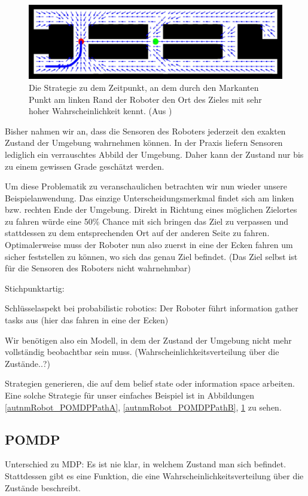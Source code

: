 \documentclass[a4paper]{IEEEtran}
\begin{document}
\begin{figure}[ht]
	\centering
	\includegraphics[scale=0.72]{images/autnmRobot_POMDPPathC.png}
	\caption{Die Strategie zu dem Zeitpunkt, an dem durch den Markanten Punkt am linken Rand der Roboter den Ort des Zieles mit sehr hoher Wahrscheinlichkeit kennt. (Aus \cite{thrun2005probabilistic})}
	\label{autnmRobot_POMDPPathC}
\end{figure}

Bisher nahmen wir an, dass die Sensoren des Roboters jederzeit den exakten Zustand der Umgebung wahrnehmen können. In der Praxis liefern Sensoren lediglich ein verrauschtes Abbild der Umgebung. Daher kann der Zustand nur bis zu einem gewissen Grade geschätzt werden.

Um diese Problematik zu veranschaulichen betrachten wir nun wieder unsere Beispielanwendung. Das einzige Unterscheidungsmerkmal findet sich am linken bzw. rechten Ende der Umgebung. Direkt in Richtung eines möglichen Zielortes zu fahren würde eine 50\% Chance mit sich bringen das Ziel zu verpassen und stattdessen zu dem entsprechenden Ort auf der anderen Seite zu fahren. Optimalerweise muss der Roboter nun also zuerst in eine der Ecken fahren um sicher feststellen zu können, wo sich das genau Ziel befindet. (Das Ziel selbst ist für die Sensoren des Roboters nicht wahrnehmbar)

Stichpunktartig: %

Schlüsselaspekt bei probabilistic robotics: Der Roboter führt information gather tasks aus (hier das fahren in eine der Ecken)

Wir benötigen also ein Modell, in dem der Zustand der Umgebung nicht mehr vollständig beobachtbar sein muss. (Wahrscheinlichkeitsverteilung über die Zustände..?)

Strategien generieren, die auf dem belief state oder information space arbeiten. Eine solche Strategie für unser einfaches Beispiel ist in Abbildungen \ref{autnmRobot_POMDPPathA}, \ref{autnmRobot_POMDPPathB}, \ref{autnmRobot_POMDPPathC} zu sehen.


\subsection{POMDP}
Unterschied zu MDP: Es ist nie klar, in welchem Zustand man sich befindet. Stattdessen gibt es eine Funktion, die eine Wahrscheinlichkeitsverteilung über die Zustände beschreibt.
\end{document}
